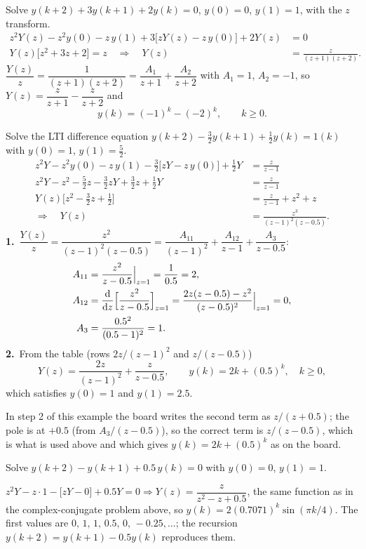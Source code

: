 \begin{example}
Solve $y(k+2)+3y(k+1)+2y(k)=0$, $y(0)=0$, $y(1)=1$, with the $z$ transform.
\begin{align*}
  z^{2}Y(z)-z^{2}y(0)-z\,y(1)+3\bigl[zY(z)-z\,y(0)\bigr]+2Y(z)&=0\\
  Y(z)\bigl[z^{2}+3z+2\bigr]=z\quad\Rightarrow\quad Y(z)&=\frac{z}{(z+1)(z+2)}.
\end{align*}
$\dfrac{Y(z)}{z}=\dfrac{1}{(z+1)(z+2)}=\dfrac{A_1}{z+1}+\dfrac{A_2}{z+2}$ with $A_1=1$, $A_2=-1$, so
$Y(z)=\dfrac{z}{z+1}-\dfrac{z}{z+2}$ and
\[
  y(k)=(-1)^{k}-(-2)^{k},\qquad k\ge0.
\]
\end{example}

\begin{example}
Solve the LTI difference equation $y(k+2)-\tfrac32y(k+1)+\tfrac12y(k)=1(k)$ with $y(0)=1$, $y(1)=\tfrac52$.
\begin{align*}
  z^{2}Y-z^{2}y(0)-z\,y(1)-\tfrac32\bigl[zY-z\,y(0)\bigr]+\tfrac12Y&=\frac{z}{z-1}\\
  z^{2}Y-z^{2}-\tfrac52z-\tfrac32zY+\tfrac32z+\tfrac12Y&=\frac{z}{z-1}\\
  Y(z)\bigl[z^{2}-\tfrac32z+\tfrac12\bigr]&=\frac{z}{z-1}+z^{2}+z\\
  \Rightarrow\quad Y(z)&=\frac{z^{3}}{(z-1)^{2}(z-0.5)}.
\end{align*}
\textbf{1.}\
$\dfrac{Y(z)}{z}=\dfrac{z^{2}}{(z-1)^{2}(z-0.5)}=\dfrac{A_{11}}{(z-1)^{2}}+\dfrac{A_{12}}{z-1}+\dfrac{A_3}{z-0.5}$:
\begin{align*}
  A_{11}&=\frac{z^{2}}{z-0.5}\Big|_{z=1}=\frac{1}{0.5}=2,\\
  A_{12}&=\frac{\mathrm{d}}{\mathrm{d} z}\Bigl[\frac{z^{2}}{z-0.5}\Bigr]_{z=1}=\frac{2z(z-0.5)-z^{2}}{(z-0.5)^{2}}\Big|_{z=1}=0,\\
  A_3&=\frac{0.5^{2}}{(0.5-1)^{2}}=1.
\end{align*}
\textbf{2.}\ From the table (rows $2z/(z-1)^{2}$ and $z/(z-0.5)$)
\[
  Y(z)=\frac{2z}{(z-1)^{2}}+\frac{z}{z-0.5},\qquad y(k)=2k+(0.5)^{k},\quad k\ge0,
\]
which satisfies $y(0)=1$ and $y(1)=2.5$.
\end{example}

\begin{boardnote}
In step 2 of this example the board writes the second term as $z/(z+0.5)$; the pole is at $+0.5$
(from $A_3/(z-0.5)$), so the correct term is $z/(z-0.5)$, which is what is used above and which gives
$y(k)=2k+(0.5)^{k}$ as on the board.
\end{boardnote}

\begin{problem}
Solve $y(k+2)-y(k+1)+0.5\,y(k)=0$ with $y(0)=0$, $y(1)=1$.
\end{problem}
\begin{solution}
$z^{2}Y-z\cdot1-\bigl[zY-0\bigr]+0.5Y=0\Rightarrow Y(z)=\dfrac{z}{z^{2}-z+0.5}$, the same function as in
the complex-conjugate problem above, so $y(k)=2(0.7071)^{k}\sin(\pi k/4)$. The first values are $0,\,1,\,1,\,0.5,\,0,\,-0.25,\dots$;
the recursion $y(k+2)=y(k+1)-0.5y(k)$ reproduces them.
\end{solution}

